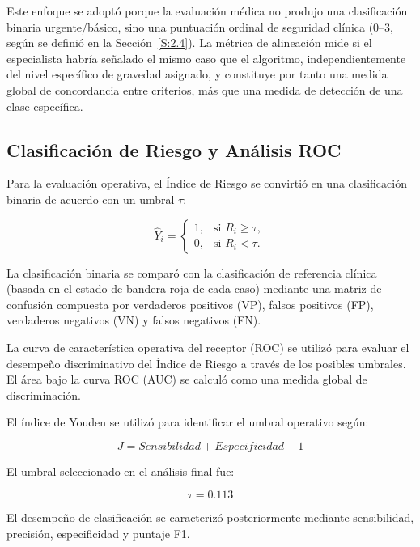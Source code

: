 \documentclass[final,11pt,3p]{elsarticle}
\begin{document}
Este enfoque se adoptó porque la evaluación médica no produjo una clasificación binaria urgente/básico, sino una puntuación ordinal de seguridad clínica (0--3, según se definió en la Sección~\ref{S:2.4}). La métrica de alineación mide si el especialista habría señalado el mismo caso que el algoritmo, independientemente del nivel específico de gravedad asignado, y constituye por tanto una medida global de concordancia entre criterios, más que una medida de detección de una clase específica.

\subsection{Clasificación de Riesgo y Análisis ROC}
\label{S:2.10}

Para la evaluación operativa, el Índice de Riesgo se convirtió en una clasificación binaria de acuerdo con un umbral $\tau$:

\begin{equation}
\hat{Y}_i =
\begin{cases}
1, & \text{si } R_i \geq \tau,\\
0, & \text{si } R_i < \tau.
\end{cases}
\label{eq:binary-risk}
\end{equation}

La clasificación binaria se comparó con la clasificación de referencia clínica (basada en el estado de bandera roja de cada caso) mediante una matriz de confusión compuesta por verdaderos positivos (VP), falsos positivos (FP), verdaderos negativos (VN) y falsos negativos (FN).

La curva de característica operativa del receptor (ROC) se utilizó para evaluar el desempeño discriminativo del Índice de Riesgo a través de los posibles umbrales. El área bajo la curva ROC (AUC) se calculó como una medida global de discriminación.

El índice de Youden se utilizó para identificar el umbral operativo según:

\begin{equation}
J = Sensibilidad + Especificidad - 1
\label{eq:youden}
\end{equation}

El umbral seleccionado en el análisis final fue:

\begin{equation}
\tau = 0.113
\label{eq:threshold}
\end{equation}

El desempeño de clasificación se caracterizó posteriormente mediante sensibilidad, precisión, especificidad y puntaje F1.
\end{document}
